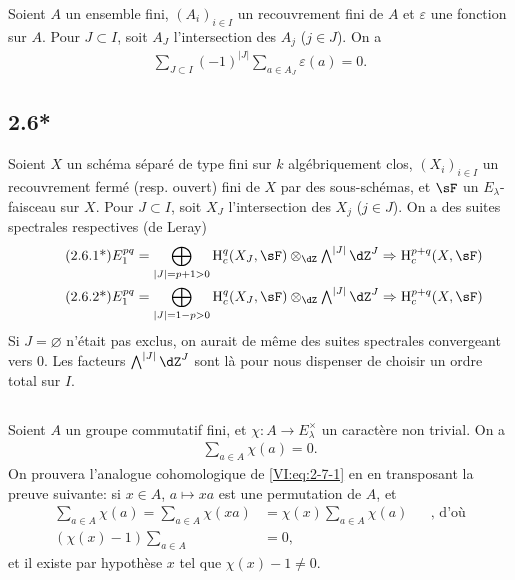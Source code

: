 Soient $A$ un ensemble fini, $(A_i)_{i\in I}$ un recouvrement fini de $A$ et 
$\varepsilon$ une fonction sur $A$. Pour $J\subset I$, soit $A_J$ 
l'intersection des $A_j$ ($j\in J$). On a 
\begin{align*}\tag{2.6.1}\label{VI:eq:2-6-1}
  \sum_{J\subset I} (-1)^{|J|} \sum_{a\in A_J} \varepsilon(a) = 0 \text{.}
\end{align*}





\subsection*{2.6*}\label{VI:2-6*}

Soient $X$ un sch\'ema s\'epar\'e de type fini sur $k$ alg\'ebriquement clos, 
$(X_i)_{i\in I}$ un recouvrement ferm\'e (resp. ouvert) fini de $X$ par des 
sous-sch\'emas, et $\sF$ un $E_\lambda$-faisceau sur $X$. Pour $J\subset I$, 
soit $X_J$ l'intersection des $X_j$ ($j\in J$). On a des suites spectrales 
respectives (de Leray) 
\begin{align*}\tag{2.6.1*}\label{VI:eq:2-6-1*}
  E_1^{p q} &= \bigoplus_{|J|=p+1>0} \h_c^q(X_J,\sF) \otimes_\dZ \textstyle\bigwedge^{|J|} \dZ^J \Rightarrow \h_c^{p+q}(X,\sF) \\ 
  \tag{2.6.2*}\label{VI:eq:2-6-2*}
  E_1^{p q} &= \bigoplus_{|J|=1-p>0} \h_c^q(X_J,\sF) \otimes_\dZ \textstyle\bigwedge^{|J|} \dZ^J \Rightarrow \h_c^{p+q}(X,\sF)
\end{align*}
Si $J=\varnothing$ n'\'etait pas exclus, on aurait de m\^eme des suites 
spectrales convergeant vers $0$. Les facteurs $\bigwedge^{|J|} \dZ^J$ sont l\`a 
pour nous dispenser de choisir un ordre total sur $I$. 





\subsection{}\label{VI:2-7}

Soient $A$ un groupe commutatif fini, et $\chi:A \to E_\lambda^\times$ un 
caract\`ere non trivial. On a 
\begin{align*}\tag{2.7.1}\label{VI:eq:2-7-1}
  \sum_{a\in A} \chi(a) = 0 \text{.}
\end{align*}
On prouvera l'analogue cohomologique de \eqref{VI:eq:2-7-1} en en transposant 
la preuve suivante: si $x\in A$, $a\mapsto x a$ est une permutation de $A$, et 
\begin{align*}
  \sum_{a\in A}\chi(a) = \sum_{a\in A} \chi(x a) &= \chi(x) \sum_{a\in A} \chi(a) && \text{, d'o\`u} \\
  (\chi(x)-1)\sum_{a\in A} &= 0 \text{,}
\end{align*}
et il existe par hypoth\`ese $x$ tel que $\chi(x)-1\ne 0$. 





